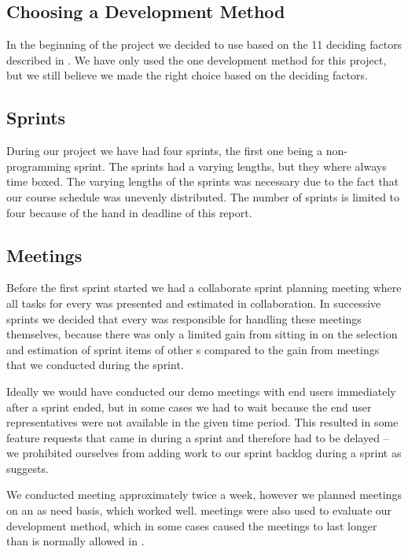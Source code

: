 \subsection{Choosing a Development Method}
In the beginning of the project we decided to use \sos{} based on the 11 deciding factors described in .
We have only used the one development method for this project, but we still believe we made the right choice based on the deciding factors.



\subsection{Sprints}
During our project we have had four sprints, the first one being a non-programming sprint.
The sprints had a varying lengths, but they where always time boxed. 
The varying lengths of the sprints was necessary due to the fact that our course schedule was unevenly distributed. 
The number of sprints is limited to four because of the hand in deadline of this report.




\subsection{Meetings}
\label{sub:interdevmeet}
Before the first sprint started we had a collaborate sprint planning meeting where all tasks for every \subgroup{} was presented and estimated in collaboration.
In successive sprints we decided that every \subgroup{} was responsible for handling these meetings themselves, because there was only a limited gain from sitting in on the selection and estimation of sprint items of other \subgroup{}s  compared to the gain from \sos{} meetings that we conducted during the sprint.

Ideally we would have conducted our demo meetings with end users immediately after a sprint ended, but in some cases we had to wait because the end user representatives were not available in the given time period.
This resulted in some feature requests that came in during a sprint and therefore had to be delayed -- we prohibited ourselves from adding work to our sprint backlog during a sprint as \scrum{} suggests.

We conducted \sos{} meeting approximately twice a week, however we planned meetings on an as need basis, which worked well.
\sos{} meetings were also used to evaluate our development method, which in some cases caused the meetings to last longer than is normally allowed in \sos{}.

